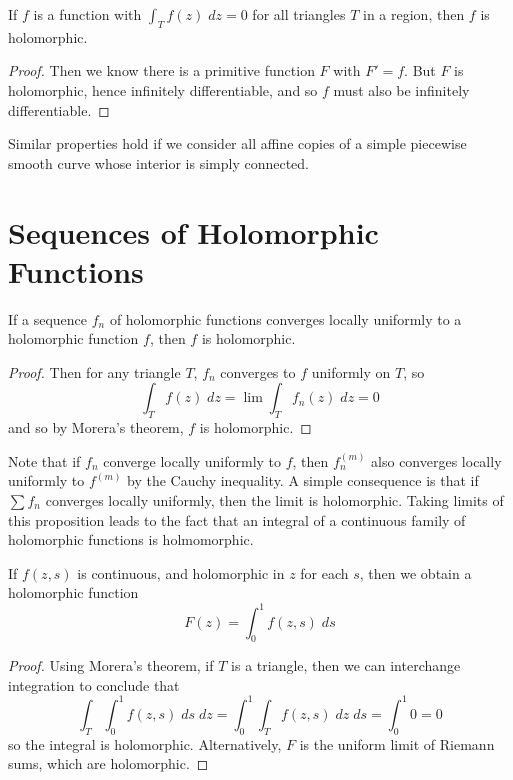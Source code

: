 \begin{theorem}[Morera]
    If $f$ is a function with $\int_T f(z)\; dz = 0$ for all triangles $T$ in a region, then $f$ is holomorphic.
\end{theorem}
\begin{proof}
    Then we know there is a primitive function $F$ with $F' = f$. But $F$ is holomorphic, hence infinitely differentiable, and so $f$ must also be infinitely differentiable.
\end{proof}

Similar properties hold if we consider all affine copies of a simple piecewise smooth curve whose interior is simply connected.

\section{Sequences of Holomorphic Functions}

\begin{theorem}
    If a sequence $f_n$ of holomorphic functions converges locally uniformly to a holomorphic function $f$, then $f$ is holomorphic.
\end{theorem}
\begin{proof}
    Then for any triangle $T$, $f_n$ converges to $f$ uniformly on $T$, so
    \[ \int_T f(z)\; dz = \lim \int_T f_n(z)\; dz = 0 \]
    and so by Morera's theorem, $f$ is holomorphic.
\end{proof}

Note that if $f_n$ converge locally uniformly to $f$, then $f_n^{(m)}$ also converges locally uniformly to $f^{(m)}$ by the Cauchy inequality. A simple consequence is that if $\sum f_n$ converges locally uniformly, then the limit is holomorphic. Taking limits of this proposition leads to the fact that an integral of a continuous family of holomorphic functions is holmomorphic.

\begin{theorem}
    If $f(z,s)$ is continuous, and holomorphic in $z$ for each $s$, then we obtain a holomorphic function
    \[ F(z) = \int_0^1 f(z,s)\; ds \]
\end{theorem}
\begin{proof}
    Using Morera's theorem, if $T$ is a triangle, then we can interchange integration to conclude that
    \[ \int_T \int_0^1 f(z,s)\; ds\; dz = \int_0^1 \int_T f(z,s)\; dz\; ds = \int_0^1 0 = 0 \]
    so the integral is holomorphic. Alternatively, $F$ is the uniform limit of Riemann sums, which are holomorphic.
\end{proof}

